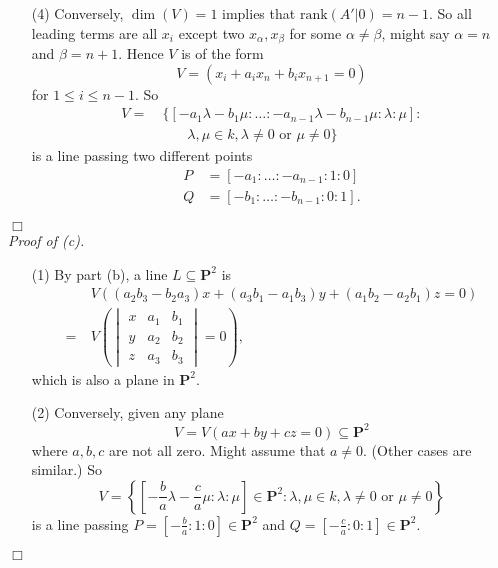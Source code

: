 \documentclass{article}
\begin{document}
\begin{enumerate}
\item[(4)]
  Conversely, $\dim(V) = 1$ implies that $\mathrm{rank}(A'|0) = n - 1$.
  So all leading terms are all $x_i$ except two $x_\alpha, x_\beta$ for some $\alpha \neq \beta$,
  might say $\alpha = n$ and $\beta = n+1$.
  Hence $V$ is of the form
  \[
    V
    = (x_i + a_{i} x_n + b_{i} x_{n+1} = 0)
  \]
  for $1 \leq i \leq n-1$.
  So
  \begin{align*}
    V
    = & \: \{ [-a_1 \lambda - b_1 \mu : \ldots : -a_{n-1} \lambda - b_{n-1} \mu :
      \lambda : \mu ] : \\
      & \qquad \lambda, \mu \in k, \lambda \neq 0 \text{ or } \mu \neq 0 \}
  \end{align*}
  is a line passing two different points
  \begin{align*}
    P &= [ -a_1 : \ldots : -a_{n-1} : 1 : 0 ] \\
    Q &= [ -b_1 : \ldots : -b_{n-1} : 0 : 1 ].
  \end{align*}
\end{enumerate}
$\Box$ \\



\emph{Proof of (c).}
\begin{enumerate}
\item[(1)]
  By part (b), a line $L \subseteq \mathbf{P}^{2}$ is
  \begin{align*}
    & \: V((a_2 b_3 - b_2 a_3) x + (a_3 b_1 - a_1 b_3) y + (a_1 b_2 - a_2 b_1) z = 0) \\
    = & \: V\left(
      \begin{vmatrix}
        x & a_1 & b_1 \\
        y & a_2 & b_2 \\
        z & a_3 & b_3
      \end{vmatrix} = 0
    \right),
  \end{align*}
  which is also a plane in $\mathbf{P}^{2}$.

\item[(2)]
  Conversely, given any plane
  \[
    V = V(ax + by + cz = 0) \subseteq \mathbf{P}^{2}
  \]
  where $a, b, c$ are not all zero.
  Might assume that $a \neq 0$. (Other cases are similar.)
  So
  \[
    V
    =
    \left\{
      \left[ -\frac{b}{a}\lambda-\frac{c}{a}\mu : \lambda : \mu \right] \in \mathbf{P}^{2}
      : \lambda, \mu \in k, \lambda \neq 0 \text{ or } \mu \neq 0
    \right\}
  \]
  is a line passing
  $P = \left[ -\frac{b}{a} : 1 : 0 \right] \in \mathbf{P}^{2}$ and
  $Q = \left[ -\frac{c}{a} : 0 : 1 \right] \in \mathbf{P}^{2}$.
\end{enumerate}
$\Box$ \\
\end{document}
